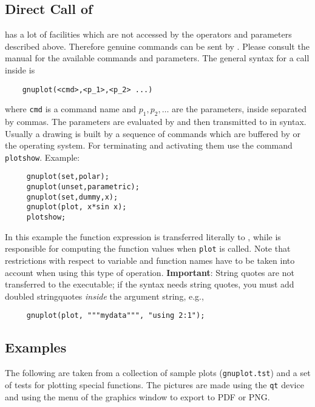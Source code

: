\subsection{Direct Call of {\Gnuplot}}
\hypertarget{command:GNUPLOT}{}

{\Gnuplot} has a lot of facilities which are not accessed by the operators and
parameters described above. Therefore genuine {\Gnuplot} commands can be sent by
{\REDUCE}.  Please consult the {\Gnuplot} manual for the available commands and
parameters. The general syntax for a {\Gnuplot} call inside {\REDUCE} is
\begin{verbatim}
    gnuplot(<cmd>,<p_1>,<p_2> ...)
\end{verbatim}
where \texttt{cmd} is a command name and $p_1,p_2, \ldots$ are the parameters,
inside {\REDUCE} separated by commas. The parameters are evaluated by {\REDUCE}
and then transmitted to {\Gnuplot} in {\Gnuplot} syntax. Usually a drawing is built by
a sequence of commands which are buffered by {\REDUCE} or the operating
system. For terminating and activating them use the {\REDUCE}
command \texttt{plotshow}.
\hypertarget{command:PLOTSHOW}{}
Example:
\begin{verbatim}
     gnuplot(set,polar);
     gnuplot(unset,parametric);
     gnuplot(set,dummy,x);
     gnuplot(plot, x*sin x);
     plotshow;
\end{verbatim}
In this example the function expression is transferred literally to {\Gnuplot},
while {\REDUCE} is responsible for computing the function values
when \texttt{plot} is called.  Note that {\Gnuplot} restrictions with respect to
variable and function names have to be taken into account when using this type
of operation. \textbf{Important}: String quotes are not transferred to the {\Gnuplot}
executable; if the {\Gnuplot} syntax needs string quotes, you must add doubled
stringquotes \emph{inside} the argument string, e.g.,
\begin{verbatim}
     gnuplot(plot, """mydata""", "using 2:1");
\end{verbatim}


\subsection{Examples}

The following are taken from a collection of sample plots
(\texttt{gnuplot.tst}) and a set of tests for plotting special
functions. The pictures are made using the \texttt{qt} {\Gnuplot}
device and using the menu of the graphics window to export to PDF or
PNG.

